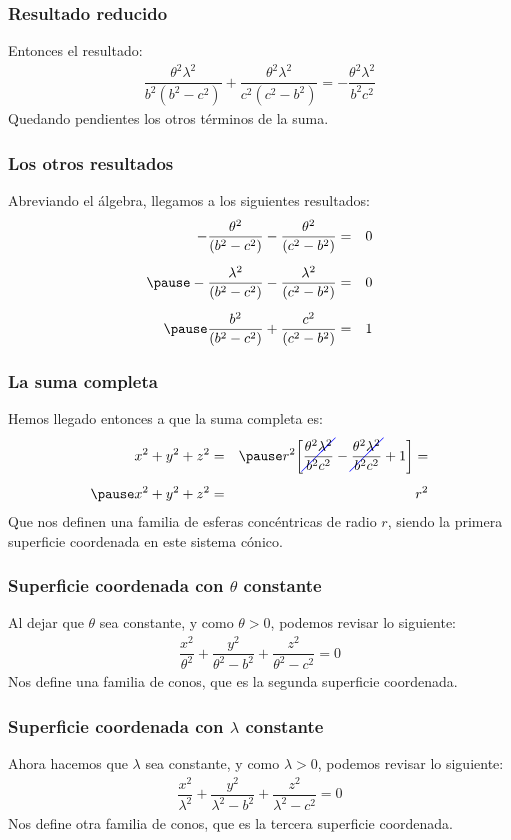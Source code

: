 \documentclass[12pt]{beamer}
\newcommand{\Cancel}[2][black]{{\color{#1}\cancel{\color{black}#2}}}
\begin{document}
\begin{frame}
\frametitle{Resultado reducido}
Entonces el resultado:
\pause
\begin{align*}
\dfrac{\theta^{2} \lambda^{2}}{b^{2}(b^{2} - c^{2})} + \dfrac{\theta^{2} \lambda^{2}}{c^{2}(c^{2} - b^{2})} = - \dfrac{\theta^{2} \lambda^{2}}{b^{2} c^{2}}
\end{align*}
\pause
Quedando pendientes los otros términos de la suma.
\end{frame}
\begin{frame}
\frametitle{Los otros resultados}
Abreviando el álgebra, llegamos a los siguientes resultados:
\pause
\begin{eqnarray*}
- \dfrac{\theta^{2}}{(b^{2} - c^{2})} - \dfrac{\theta^{2}}{(c^{2} - b^{2})} &=& 0 \\[0.5em] \pause
- \dfrac{\lambda^{2}}{(b^{2} - c^{2})} - \dfrac{\lambda^{2}}{(c^{2} - b^{2})} &=& 0 \\[0.5em] \pause
\dfrac{b^{2}}{(b^{2} - c^{2})} + \dfrac{c^{2}}{(c^{2} - b^{2})} &=& 1
\end{eqnarray*}
\end{frame}
\begin{frame}
\frametitle{La suma completa}
Hemos llegado entonces a que la suma completa es:
\begin{eqnarray*}
x^{2} + y^{2} + z^{2} &=& \pause r^{2} \bigg[ \Cancel[blue]{\dfrac{\theta^{2} \lambda^{2}}{b^{2} c^{2}}} - \Cancel[blue]{\dfrac{\theta^{2} \lambda^{2}}{b^{2} c^{2}}} + 1 \bigg] = \\[0.5em] \pause
x^{2} + y^{2} + z^{2} &=& r^{2}
\end{eqnarray*}
\pause
Que nos definen una familia de esferas concéntricas de radio $r$, siendo la primera superficie coordenada en este sistema cónico.
\end{frame}
\begin{frame}
\frametitle{Superficie coordenada con $\theta$ constante}
Al dejar que $\theta$ sea constante, y como $\theta > 0$, podemos revisar lo siguiente:
\pause
\begin{align*}
\dfrac{x^{2}}{\theta^{2}} + \dfrac{y^{2}}{\theta^{2} - b^{2}} + \dfrac{z^{2}}{\theta^{2} - c^{2}} = 0
\end{align*}
\pause
Nos define una familia de conos, que es la segunda superficie coordenada.
\end{frame}
\begin{frame}
\frametitle{Superficie coordenada con $\lambda$ constante}
Ahora hacemos que $\lambda$ sea constante, y como $\lambda > 0$, podemos revisar lo siguiente:
\pause
\begin{align*}
\dfrac{x^{2}}{\lambda^{2}} + \dfrac{y^{2}}{\lambda^{2} - b^{2}} + \dfrac{z^{2}}{\lambda^{2} - c^{2}} = 0
\end{align*}
\pause
Nos define otra familia de conos, que es la tercera superficie coordenada.
\end{frame}
\end{document}
